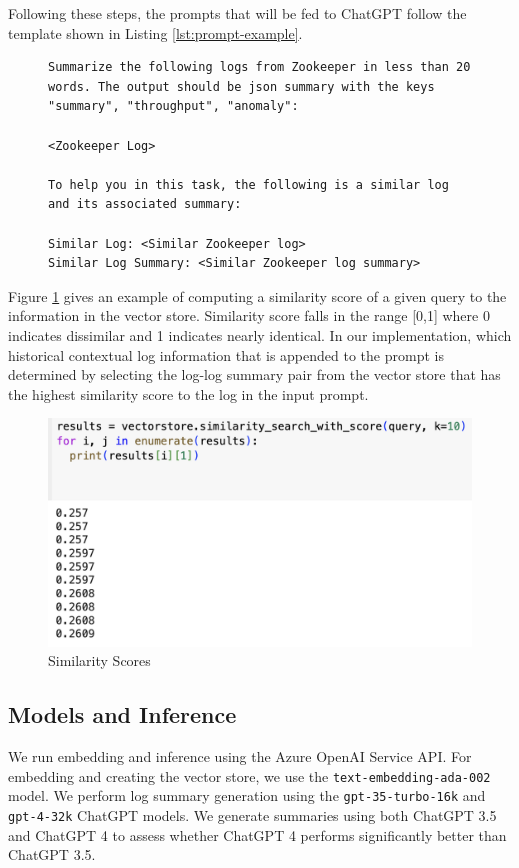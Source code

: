 \documentclass[conference]{IEEEtran}
\begin{document}
Following these steps, the prompts that will be fed to ChatGPT follow the template shown in Listing \ref{lst:prompt-example}.

\begin{figure}[ht]
\begin{lstlisting}[numbers=none, caption=Prompt Template Example, label={lst:prompt-example}]
Summarize the following logs from Zookeeper in less than 20 words. The output should be json summary with the keys "summary", "throughput", "anomaly":

<Zookeeper Log>

To help you in this task, the following is a similar log and its associated summary:

Similar Log: <Similar Zookeeper log>
Similar Log Summary: <Similar Zookeeper log summary>
\end{lstlisting}
\end{figure}

Figure \ref{fig:similar-label} gives an example of computing a similarity score of a given query to the information in the vector store. Similarity score falls in the range [0,1] where 0 indicates dissimilar and 1 indicates nearly identical. In our implementation, which historical contextual log information that is appended to the prompt is determined by selecting the log-log summary pair from the vector store that has the highest similarity score to the log in the input prompt.

\begin{figure} [h]
    \centering
    \includegraphics[width=0.8\linewidth]{Similarity.png}
    \caption{Similarity Scores}
    \label{fig:similar-label}
\end{figure}

\subsection{Models and Inference}

We run embedding and inference using the Azure OpenAI Service API. For embedding and creating the vector store, we use the \lstinline{text-embedding-ada-002} model. We perform log summary generation using the \lstinline{gpt-35-turbo-16k} and \lstinline{gpt-4-32k} ChatGPT models. We generate summaries using both ChatGPT 3.5 and ChatGPT 4 to assess whether ChatGPT 4 performs significantly better than ChatGPT 3.5.
\end{document}
